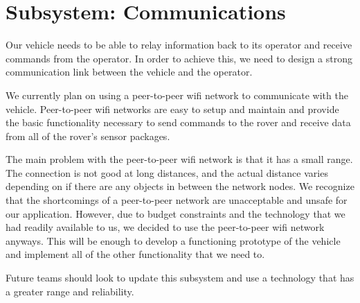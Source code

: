 \chapter{Subsystem: Communications} \label{chap:communications}

Our vehicle needs to be able to relay information back to its operator and receive commands from the operator.  In order to achieve this, we need to design a strong communication link between the vehicle and the operator.

We currently plan on using a peer-to-peer wifi network to communicate with the vehicle.  Peer-to-peer wifi networks are easy to setup and maintain and provide the basic functionality necessary to send commands to the rover and receive data from all of the rover's sensor packages.

The main problem with the peer-to-peer wifi network is that it has a small range.  The connection is not good at long distances, and the actual distance varies depending on if there are any objects in between the network nodes. We recognize that the shortcomings of a peer-to-peer network are unacceptable and unsafe for our application. However, due to budget constraints and the technology that we had readily available to us, we decided to use the peer-to-peer wifi network anyways.  This will be enough to develop a functioning prototype of the vehicle and implement all of the other functionality that we need to.

Future teams should look to update this subsystem and use a technology that has a greater range and reliability.